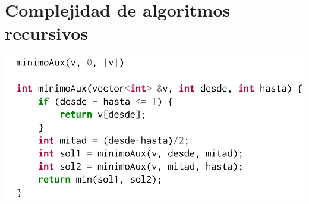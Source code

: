 \documentclass[12 pt]{article}
\begin{document}
\newpage

\section*{Complejidad de algoritmos recursivos}
    \begin{center}
        \includegraphics[width=0.7 \linewidth]{img/algoritmos-recursivos.png}
    \end{center}    
\end{document}
